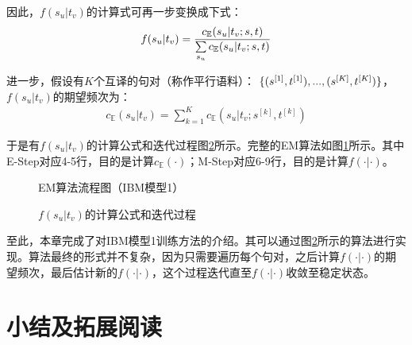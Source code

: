 \parinterval 因此，$f(s_u|t_v)$的计算式可再一步变换成下式：
\begin{eqnarray}
f(s_u|t_v)=\frac{c_{\mathbb{E}}(s_u|t_v;{s},{t})}  { \sum\limits_{s_u} c_{\mathbb{E}}(s_u|t_v;{s},{t}) }
\label{eq:5-45}
\end{eqnarray}



\parinterval 进一步，假设有$K$个互译的句对（称作平行语料）：
$\{({s}^{[1]},{t}^{[1]}),...,({s}^{[K]},{t}^{[K]})\}$，$f(s_u|t_v)$的期望频次为：
\begin{eqnarray}
c_{\mathbb{E}}(s_u|t_v)=\sum\limits_{k=1}^{K}  c_{\mathbb{E}}(s_u|t_v;s^{[k]},t^{[k]})
\label{eq:5-46}
\end{eqnarray}

\parinterval 于是有$f(s_u|t_v)$的计算公式和迭代过程图\ref{fig:5-27}所示。完整的EM算法如图\ref{fig:5-28}所示。其中E-Step对应4-5行，目的是计算$c_{\mathbb{E}}(\cdot)$；M-Step对应6-9行，目的是计算$f(\cdot|\cdot)$。

\begin{figure}[htp]
    \centering
    
   \caption{EM算法流程图（IBM模型1）}
   \label{fig:5-28}
\end{figure}
\begin{figure}[htp]
    \centering

   \caption{$f(s_u|t_v)$的计算公式和迭代过程}
   \label{fig:5-27}
\end{figure}

\parinterval 至此，本章完成了对IBM模型1训练方法的介绍。其可以通过图\ref{fig:5-27}所示的算法进行实现。算法最终的形式并不复杂，因为只需要遍历每个句对，之后计算$f(\cdot|\cdot)$的期望频次，最后估计新的$f(\cdot|\cdot)$，这个过程迭代直至$f(\cdot|\cdot)$收敛至稳定状态。

\vspace{-1.5em}




\sectionnewpage
\section{小结及拓展阅读}

